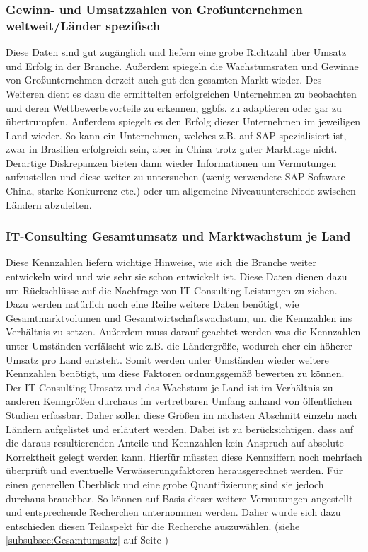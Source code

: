 \subsubsection{Gewinn- und Umsatzzahlen von Großunternehmen weltweit/Länder spezifisch}
Diese Daten sind gut zugänglich und liefern eine grobe Richtzahl über Umsatz und Erfolg in der Branche. 
Außerdem spiegeln die Wachstumsraten und Gewinne von Großunternehmen derzeit auch gut den gesamten Markt wieder. 
Des Weiteren dient es dazu die ermittelten erfolgreichen Unternehmen zu beobachten und deren  Wettbewerbsvorteile zu erkennen, ggbfs. zu adaptieren oder gar zu übertrumpfen.
Außerdem spiegelt es den Erfolg dieser Unternehmen im jeweiligen Land wieder. So kann ein Unternehmen, welches z.B. auf SAP spezialisiert ist, zwar in Brasilien erfolgreich sein, aber in China trotz guter Marktlage nicht. 
 Derartige Diskrepanzen bieten dann wieder Informationen um Vermutungen aufzustellen und diese weiter zu untersuchen (wenig verwendete SAP Software China, starke Konkurrenz etc.) oder um allgemeine Niveauunterschiede zwischen Ländern abzuleiten.

\subsubsection{IT-Consulting Gesamtumsatz und Marktwachstum je Land}
Diese Kennzahlen liefern wichtige Hinweise, wie sich die Branche weiter entwickeln wird und wie sehr sie schon entwickelt ist. 
Diese Daten dienen dazu um Rückschlüsse auf die Nachfrage von IT-Consulting-Leistungen zu ziehen. 
Dazu werden natürlich noch eine Reihe weitere Daten benötigt, wie Gesamtmarktvolumen und Gesamtwirtschaftswachstum, um die Kennzahlen ins Verhältnis zu setzen.
 Außerdem muss darauf geachtet werden was die Kennzahlen unter Umständen verfälscht wie z.B. die Ländergröße, wodurch eher ein höherer Umsatz pro Land entsteht. 
 Somit werden unter Umständen wieder weitere Kennzahlen benötigt, um diese Faktoren ordnungsgemäß bewerten zu können.
Der IT-Consulting-Umsatz und das Wachstum je Land ist im Verhältnis zu anderen Kenngrößen durchaus im vertretbaren Umfang anhand von öffentlichen Studien erfassbar. 
Daher sollen diese Größen im nächsten Abschnitt einzeln nach Ländern aufgelistet und erläutert werden. 
 Dabei ist zu berücksichtigen, dass auf die daraus resultierenden Anteile und Kennzahlen kein Anspruch auf absolute Korrektheit gelegt werden kann. 
 Hierfür müssten diese Kennziffern noch mehrfach überprüft und eventuelle Verwässerungsfaktoren herausgerechnet werden. 
 Für einen generellen Überblick und eine grobe Quantifizierung sind sie jedoch durchaus brauchbar. So können auf Basis dieser weitere Vermutungen angestellt und entsprechende Recherchen unternommen werden.
Daher wurde sich dazu entschieden diesen Teilaspekt für die Recherche auszuwählen. (siehe  \ref{subsubsec:Gesamtumsatz}  auf Seite \pageref{subsubsec:Gesamtumsatz})

